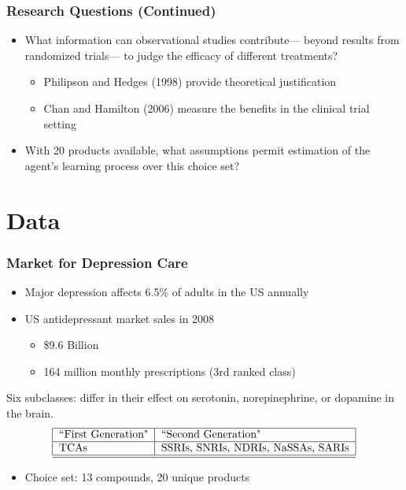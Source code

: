 \documentclass[xcolor=pdftex,dvipsnames,table,mathserif,aspectratio=169]{beamer}
\begin{document}
\begin{frame}
\frametitle{Research Questions (Continued)}

\begin{itemize}
\item What information can observational studies contribute--- beyond
results from randomized trials--- to judge the efficacy of different
treatments?

\begin{itemize}
\item Philipson and Hedges (1998) provide theoretical justification

\item Chan and Hamilton (2006) measure the benefits in the clinical trial
setting
\end{itemize}

\item With 20 products available, what assumptions permit estimation of the
agent's learning process over this choice set?
\end{itemize}
\end{frame}


\section{Data}


\begin{frame}
\frametitle{Market for Depression Care}

\begin{itemize}
\item Major depression affects 6.5\% of adults in the US annually

\item US antidepressant market sales in 2008

\begin{itemize}
\item \$9.6 Billion

\item 164 million monthly prescriptions (3rd ranked class)
\end{itemize}
\end{itemize}

Six subclasses: differ in their effect on serotonin, norepinephrine, or
dopamine in the brain.%
\[
\begin{tabular}{|l|l|}
\hline
$\text{``First Generation"}$ & $\text{``Second Generation"}$ \\ \hline
$\text{TCAs}$ & $\text{SSRIs, SNRIs, NDRIs, NaSSAs, SARIs}$ \\ \hline\hline
\end{tabular}%
\]

\begin{itemize}
\item Choice set: 13 compounds, 20 unique products
\end{itemize}
\end{frame}
\end{document}

